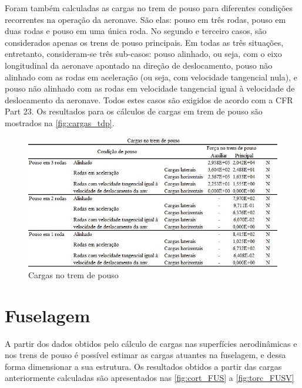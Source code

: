 Foram também calculadas as cargas no trem de pouso para diferentes condições recorrentes na operação da aeronave. São elas: pouso em três rodas, pouso em duas rodas e pouso em uma única roda. No segundo e terceiro casos, são considerados apenas os trens de pouso principais. Em todas as três situações, entretanto, consideram-se três sub-casos: pouso alinhado, ou seja, com o eixo longitudinal da aeronave apontado na direção de deslocamento, pouso não alinhado com as rodas em aceleração (ou seja, com velocidade tangencial nula), e pouso não alinhado com as rodas em velocidade tangencial igual à velocidade de deslocamento da aeronave. Todos estes casos são exigidos de acordo com a CFR Part 23.
Os resultados para os cálculos de cargas em trem de pouso são mostrados na \autoref{fig:cargas_tdp}.

\begin{figure}
\centering
\includegraphics[width=\textwidth]{cargas/imagens/Cargas_tdp.jpg}
\caption{Cargas no trem de pouso}
\label{fig:cargas_tdp}
\end{figure}


\section{Fuselagem}

A partir dos dados obtidos pelo cálculo de cargas nas superfícies aerodinâmicas e nos trens de pouso é possível estimar as cargas atuantes na fuselagem, e dessa forma dimensionar a sua estrutura. Os resultados obtidos a partir das cargas anteriormente calculadas são apresentados nas \autoref{fig:cort_FUS} a \autoref{fig:torc_FUSV}


